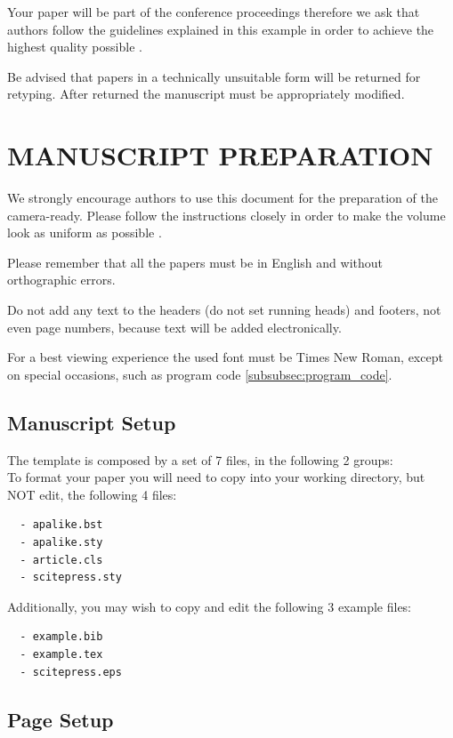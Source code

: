 \documentclass[a4paper,twoside]{article}
\begin{document}
Your paper will be part of the conference proceedings
therefore we ask that authors follow the guidelines explained in
this example in order to achieve the highest quality possible
\cite{Smith98}.

Be advised that papers in a technically unsuitable form will be
returned for retyping. After returned the manuscript must be
appropriately modified.

\section{\uppercase{Manuscript Preparation}}

We strongly encourage authors to use this document for the
preparation of the camera-ready. Please follow the instructions
closely in order to make the volume look as uniform as possible
\cite{Moore99}.

Please remember that all the papers must be in English and without
orthographic errors.

Do not add any text to the headers (do not set running heads) and
footers, not even page numbers, because text will be added
electronically.

For a best viewing experience the used font must be Times New
Roman, except on special occasions, such as program code
\ref{subsubsec:program_code}.


\subsection{Manuscript Setup}

The template is composed by a set of 7 files, in the
following 2 groups:\\
 To format your paper you will need to copy
into your working directory, but NOT edit, the following 4 files:
\begin{verbatim}
  - apalike.bst
  - apalike.sty
  - article.cls
  - scitepress.sty
\end{verbatim}

 Additionally, you may wish to copy and edit
the following 3 example files:
\begin{verbatim}
  - example.bib
  - example.tex
  - scitepress.eps
\end{verbatim}


\subsection{Page Setup}
\end{document}
